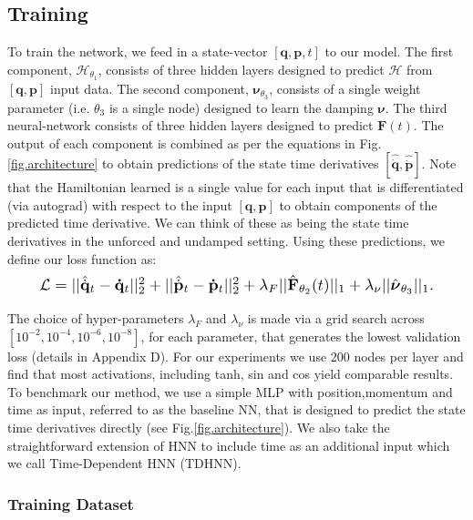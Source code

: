 \documentclass{article}
\begin{document}
\subsection{Training}
To train the network, we feed in a state-vector $ [\mathbf{q},\mathbf{p},t]$ to our model. The first component, $\mathcal{H}_{\theta_1}$, consists of three hidden layers designed to predict $\mathcal{H}$ from $[\mathbf{q},\mathbf{p}]$ input data. The second component, $\boldsymbol\nu_{\theta_3}$, consists of a single weight parameter (i.e. $\theta_3$ is a single node) designed to learn the damping $\boldsymbol\nu$. The third neural-network consists of three hidden layers designed to predict $\mathbf{F}(t)$. The output of each component is combined as per the equations in Fig.\ref{fig.architecture} to obtain predictions of the state time derivatives $[\hat{\dot{\mathbf{q}}},\hat{\dot{\mathbf{p}}}]$. Note that the Hamiltonian learned is a single value for each input that is differentiated (via autograd) with respect to the input $[\mathbf{q},\mathbf{p}]$ to obtain components of the predicted time derivative. We can think of these as being the state time derivatives in the unforced and undamped setting. Using these predictions, we define our loss function as:
\begin{equation}
\label{eqn.loss}
\resizebox{0.9\columnwidth}{!}{%
  $\mathcal{L} =|| \hat{\dot{\mathbf{q}}}_t - \mathbf{\dot{q}}_t ||_2^2 +
|| \hat{\dot{\mathbf{p}}}_t -\mathbf{\dot{p}}_t ||_2^2 + \lambda_F|| \hat{\mathbf{F}}_{\theta_2} (t)||_1 + \lambda_\nu||\hat{\boldsymbol\nu}_{\theta_3}||_1$.%
}
\end{equation}

The choice of hyper-parameters $\lambda_F$ and $\lambda_{\nu}$ is made via a grid search across $[10^{-2},10^{-4},10^{-6},10^{-8}]$, for each parameter, that generates the lowest validation loss (details in Appendix D). For our experiments we use 200 nodes per layer and find that most activations, including tanh, sin and cos yield comparable results. To benchmark our method, we use a simple MLP with position,momentum and time as input, referred to as the baseline NN, that is designed to predict the state time derivatives directly (see Fig.\ref{fig.architecture}). We also take the straightforward extension of HNN to include time as an additional input which we call Time-Dependent HNN (TDHNN). 
\subsubsection{Training Dataset}
\end{document}

